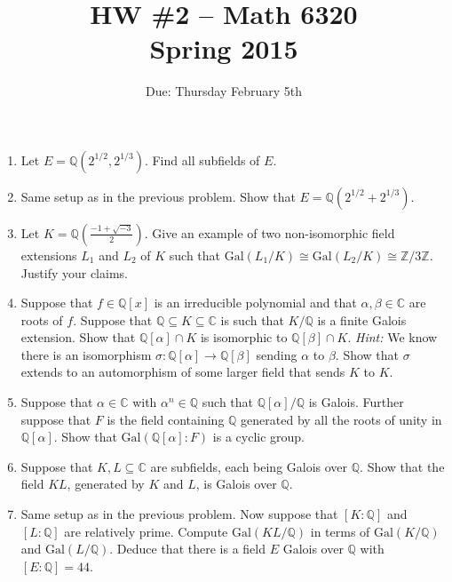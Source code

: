 \documentclass[11pt]{amsart}
\theoremstyle{theorem}
\renewcommand{\to}[1][]{\xrightarrow{\ #1\ }}
\newcommand{\bQ}{\mathbb{Q}}
\newcommand{\bC}{\mathbb{C}}
\newcommand{\Gal}{\text{Gal}}
\begin{document}
\title{HW \#2 -- Math 6320\\Spring 2015}
\author{Due: Thursday February 5th}
\maketitle

\begin{enumerate}
\item Let $E = \bQ(2^{1/2}, 2^{1/3})$.  Find all subfields of $E$.  
\item Same setup as in the previous problem.  Show that $E = \bQ(2^{1/2} + 2^{1/3})$.  
\item Let $K=\mathbb{Q}\left(\frac{-1+\sqrt{-3}}{2}\right)$. Give an example of two non-isomorphic field extensions $L_1$ and $L_2$
of $K$ such that $\mathrm{Gal}(L_1/K)\cong \mathrm{Gal}(L_2/ K)\cong \mathbb{Z}/3\mathbb{Z}$. Justify your claims. 
\item  Suppose that $f \in \bQ[x]$ is an irreducible polynomial and that $\alpha,\beta \in \bC$ are roots of $f$.  Suppose that $\bQ \subseteq K \subseteq \bC$ is such that $K/\bQ$ is a finite Galois extension.  Show that $\bQ[\alpha] \cap K$ is isomorphic to $\bQ[\beta] \cap K$.
\vskip 3pt
\emph{Hint:} We know there is an isomorphism $\sigma : \bQ[\alpha] \to \bQ[\beta]$ sending $\alpha$ to $\beta$.  Show that $\sigma$ extends to an automorphism of some larger field that sends $K$ to $K$.  
\item Suppose that $\alpha \in  \bC$ with $\alpha^n \in \bQ$ such that $\bQ[\alpha] / \bQ$ is Galois. Further
suppose that $F$ is the field containing $\bQ$ generated by all the roots of unity
in $\bQ[\alpha]$. Show that $\Gal(\bQ[\alpha] : F )$ is a cyclic group.
\item Suppose that $K, L \subseteq \bC$ are subfields, each being Galois over $\bQ$. Show that the
field $KL$, generated by $K$ and $L$, is Galois over $\bQ$. 
\item Same setup as in the previous problem.  Now suppose that $[K : \bQ]$ and $[L : \bQ]$ are relatively prime.  Compute $\Gal(KL/\bQ)$ in terms of $\Gal(K/\bQ)$ and $\Gal(L/\bQ)$.  Deduce that there is a field $E$ Galois over $\bQ$ with $[E : \bQ] = 44$.
\end{enumerate}
\end{document}
